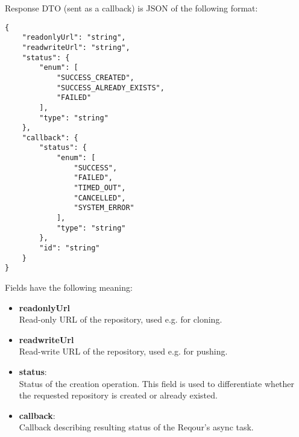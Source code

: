 \documentclass[../main.tex]{subfiles}
\begin{document}
Response DTO (sent as a callback) is JSON of the following format:
\begin{lstlisting}[numbers=none]
{
    "readonlyUrl": "string",
    "readwriteUrl": "string",
    "status": {
        "enum": [
            "SUCCESS_CREATED",
            "SUCCESS_ALREADY_EXISTS",
            "FAILED"
        ],
        "type": "string"
    },
    "callback": {
        "status": {
            "enum": [
                "SUCCESS",
                "FAILED",
                "TIMED_OUT",
                "CANCELLED",
                "SYSTEM_ERROR"
            ],
            "type": "string"
        },
        "id": "string"
    }
}
\end{lstlisting}

Fields have the following meaning:
\begin{itemize}
    \item \textbf{readonlyUrl}\\
    Read-only URL of the repository, used e.g. for cloning.

    \item \textbf{readwriteUrl}\\
    Read-write URL of the repository, used e.g. for pushing.

    \item \textbf{status}:\\
    Status of the creation operation. This field is used to differentiate whether the requested repository is created or already existed.

    \item \textbf{callback}:\\
    Callback describing resulting status of the Reqour's async task.
\end{itemize}
\end{document}
